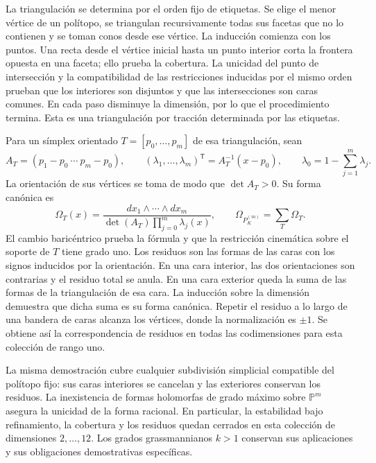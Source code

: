La triangulación se determina por el orden fijo de etiquetas. Se elige
el menor vértice de un polítopo, se triangulan recursivamente todas sus
facetas que no lo contienen y se toman conos desde ese vértice. La
inducción comienza con los puntos. Una recta desde el vértice inicial
hasta un punto interior corta la frontera opuesta en una faceta; ello
prueba la cobertura. La unicidad del punto de intersección y la
compatibilidad de las restricciones inducidas por el mismo orden prueban
que los interiores son disjuntos y que las intersecciones son caras
comunes. En cada paso disminuye la dimensión, por lo que el procedimiento
termina. Esta es una triangulación por tracción determinada por las
etiquetas.

Para un símplex orientado
\(T=[p_0,\ldots,p_m]\) de esa triangulación, sean
\[
 A_T=(p_1-p_0\ \cdots\ p_m-p_0),\qquad
 (\lambda_1,\ldots,\lambda_m)^\mathsf T=A_T^{-1}(x-p_0),
 \qquad\lambda_0=1-\sum_{j=1}^m\lambda_j.
\]
La orientación de sus vértices se toma de modo que \(\det A_T>0\).
Su forma canónica es
\begin{equation}
 \Omega_T(x)=
 \frac{dx_1\wedge\cdots\wedge dx_m}
 {\det(A_T)\prod_{j=0}^m\lambda_j(x)},\qquad
 \Omega_{P_K^{(m)}}=\sum_{T}\Omega_T.
 \label{eq:polygon-higher-form}
\end{equation}
El cambio baricéntrico prueba la fórmula y que la restricción cinemática
sobre el soporte de \(T\) tiene grado uno. Los residuos son las formas
de las caras con los signos inducidos por la orientación. En una cara
interior, las dos orientaciones son contrarias y el residuo total se
anula. En una cara exterior queda la suma de las formas de la
triangulación de esa cara. La inducción sobre la dimensión demuestra
que dicha suma es su forma canónica. Repetir el residuo a lo largo de
una bandera de caras alcanza los vértices, donde la normalización es
\(\pm1\). Se obtiene así la correspondencia de residuos en todas las
codimensiones para esta colección de rango uno.

La misma demostración cubre cualquier subdivisión simplicial compatible
del polítopo fijo: sus caras interiores se cancelan y las exteriores
conservan los residuos. La inexistencia de formas holomorfas de grado
máximo sobre \(\mathbb P^m\) asegura la unicidad de la forma racional.
En particular, la estabilidad bajo refinamiento, la cobertura y los
residuos quedan cerrados en esta colección de dimensiones \(2,\ldots,12\).
Los grados grassmannianos \(k>1\) conservan sus aplicaciones y sus
obligaciones demostrativas específicas.
